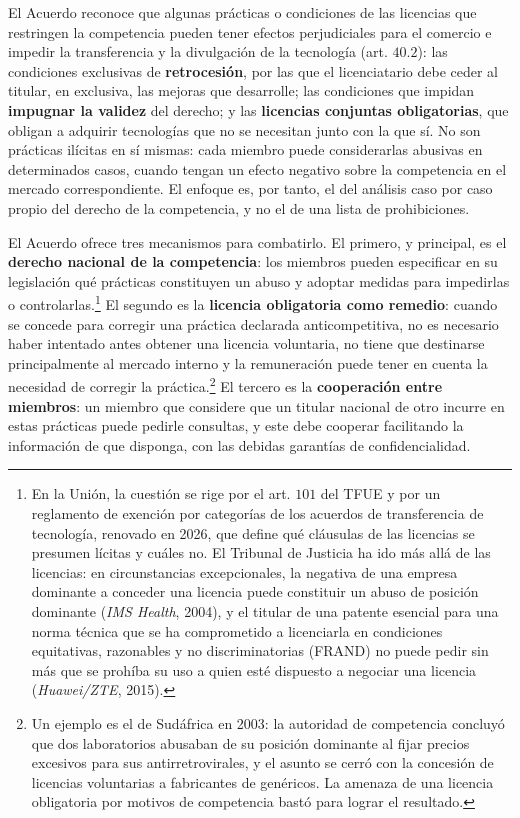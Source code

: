 \documentclass[10pt,a4paper]{article}
\begin{document}
El Acuerdo reconoce que algunas prácticas o condiciones de las licencias que restringen la competencia pueden tener efectos perjudiciales para el comercio e impedir la transferencia y la divulgación de la tecnología (art. $40.2$): las condiciones exclusivas de \textbf{retrocesión}, por las que el licenciatario debe ceder al titular, en exclusiva, las mejoras que desarrolle; las condiciones que impidan \textbf{impugnar la validez} del derecho; y las \textbf{licencias conjuntas obligatorias}, que obligan a adquirir tecnologías que no se necesitan junto con la que sí. No son prácticas ilícitas en sí mismas: cada miembro puede considerarlas abusivas en determinados casos, cuando tengan un efecto negativo sobre la competencia en el mercado correspondiente. El enfoque es, por tanto, el del análisis caso por caso propio del derecho de la competencia, y no el de una lista de prohibiciones.

El Acuerdo ofrece tres mecanismos para combatirlo. El primero, y principal, es el \textbf{derecho nacional de la competencia}: los miembros pueden especificar en su legislación qué prácticas constituyen un abuso y adoptar medidas para impedirlas o controlarlas.\footnote{%
    En la Unión, la cuestión se rige por el art. $101$ del TFUE y por un reglamento de exención por categorías de los acuerdos de transferencia de tecnología, renovado en 2026, que define qué cláusulas de las licencias se presumen lícitas y cuáles no. El Tribunal de Justicia ha ido más allá de las licencias: en circunstancias excepcionales, la negativa de una empresa dominante a conceder una licencia puede constituir un abuso de posición dominante (\textit{IMS Health}, 2004), y el titular de una patente esencial para una norma técnica que se ha comprometido a licenciarla en condiciones equitativas, razonables y no discriminatorias (FRAND) no puede pedir sin más que se prohíba su uso a quien esté dispuesto a negociar una licencia (\textit{Huawei/ZTE}, 2015).
} El segundo es la \textbf{licencia obligatoria como remedio}: cuando se concede para corregir una práctica declarada anticompetitiva, no es necesario haber intentado antes obtener una licencia voluntaria, no tiene que destinarse principalmente al mercado interno y la remuneración puede tener en cuenta la necesidad de corregir la práctica.\footnote{%
    Un ejemplo es el de Sudáfrica en 2003: la autoridad de competencia concluyó que dos laboratorios abusaban de su posición dominante al fijar precios excesivos para sus antirretrovirales, y el asunto se cerró con la concesión de licencias voluntarias a fabricantes de genéricos. La amenaza de una licencia obligatoria por motivos de competencia bastó para lograr el resultado.
} El tercero es la \textbf{cooperación entre miembros}: un miembro que considere que un titular nacional de otro incurre en estas prácticas puede pedirle consultas, y este debe cooperar facilitando la información de que disponga, con las debidas garantías de confidencialidad.
\end{document}
